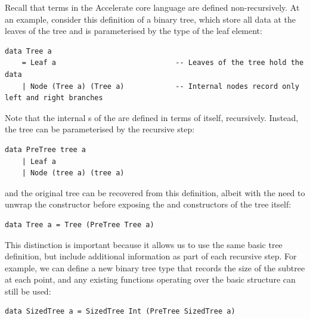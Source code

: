 Recall that terms in the Accelerate core language are defined non-recursively.
At an example, consider this definition of a binary tree, which store all data
at the leaves of the tree and is parameterised by the type of the leaf element:
%
\begin{lstlisting}[style=haskell]
data Tree a
    = Leaf a                            -- Leaves of the tree hold the data
    | Node (Tree a) (Tree a)            -- Internal nodes record only left and right branches
\end{lstlisting}
%
Note that the internal s of the  are defined in terms of
itself, recursively. Instead, the tree can be parameterised by the recursive
step:
%
\begin{lstlisting}[style=haskell]
data PreTree tree a
    | Leaf a
    | Node (tree a) (tree a)
\end{lstlisting}
%
and the original tree can be recovered from this definition, albeit with the
need to unwrap the  constructor before exposing the  and
 constructors of the tree itself:
%
\begin{lstlisting}[style=haskell,firstnumber=4]
data Tree a = Tree (PreTree Tree a)
\end{lstlisting}

This distinction is important because it allows us to use the same basic tree
definition, but include additional information as part of each recursive step.
For example, we can define a new binary tree type that records the size of the
subtree at each point, and any existing functions operating over the basic
 structure can still be used:
%
\begin{lstlisting}[style=haskell,firstnumber=5]
data SizedTree a = SizedTree Int (PreTree SizedTree a)
\end{lstlisting}

